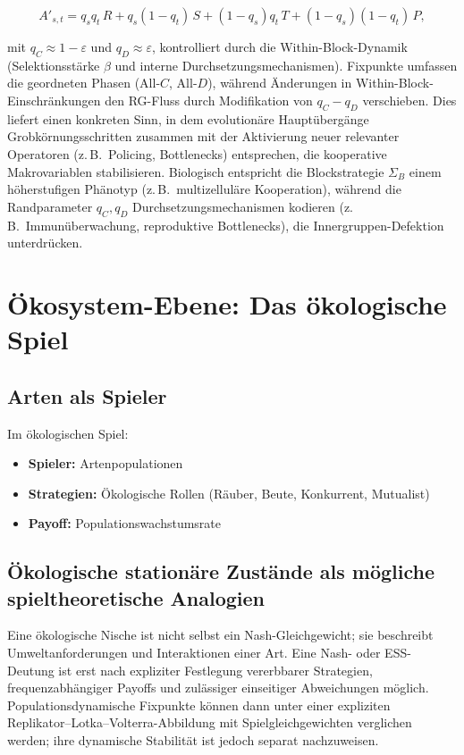\documentclass[12pt,a4paper]{article}
\theoremstyle{remark}
\begin{document}
\[
A'_{s,t}
= q_s q_t\,R + q_s(1-q_t)\,S + (1-q_s)q_t\,T + (1-q_s)(1-q_t)\,P,
\]

mit $q_C\approx 1-\varepsilon$ und $q_D\approx \varepsilon$, kontrolliert durch die Within-Block-Dynamik (Selektionsstärke $\beta$ und interne Durchsetzungsmechanismen).
Fixpunkte umfassen die geordneten Phasen (All-$C$, All-$D$), während Änderungen in Within-Block-Einschränkungen den RG-Fluss durch Modifikation von $q_C-q_D$ verschieben.
Dies liefert einen konkreten Sinn, in dem evolutionäre Hauptübergänge Grobkörnungsschritten zusammen mit der Aktivierung neuer relevanter Operatoren (z.\,B.\ Policing, Bottlenecks) entsprechen, die kooperative Makrovariablen stabilisieren. Biologisch entspricht die Blockstrategie $\Sigma_B$ einem höherstufigen Phänotyp (z.\,B.\ multizelluläre Kooperation), während die Randparameter $q_C, q_D$ Durchsetzungsmechanismen kodieren (z.\,B.\ Immunüberwachung, reproduktive Bottlenecks), die Innergruppen-Defektion unterdrücken.

\section{Ökosystem-Ebene: Das ökologische Spiel}
\label{sec:ecosystem}

\subsection{Arten als Spieler}

Im ökologischen Spiel:
\begin{itemize}
    \item \textbf{Spieler:} Artenpopulationen
    \item \textbf{Strategien:} Ökologische Rollen (Räuber, Beute, Konkurrent, Mutualist)
    \item \textbf{Payoff:} Populationswachstumsrate
\end{itemize}

\subsection{Ökologische stationäre Zustände als mögliche spieltheoretische Analogien}

Eine ökologische Nische ist nicht selbst ein Nash-Gleichgewicht; sie beschreibt Umweltanforderungen und Interaktionen einer Art. Eine Nash- oder ESS-Deutung ist erst nach expliziter Festlegung vererbbarer Strategien, frequenzabhängiger Payoffs und zulässiger einseitiger Abweichungen möglich. Populationsdynamische Fixpunkte können dann unter einer expliziten Replikator--Lotka--Volterra-Abbildung mit Spielgleichgewichten verglichen werden; ihre dynamische Stabilität ist jedoch separat nachzuweisen.
\end{document}
